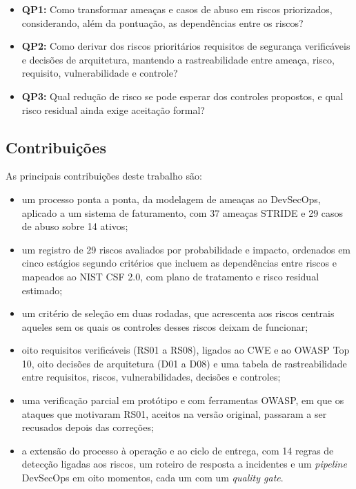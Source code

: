\documentclass[conference]{IEEEtran}
\begin{document}
\begin{itemize}
    \item \textbf{QP1:} Como transformar ameaças e casos de abuso em riscos priorizados, considerando, além da pontuação, as dependências entre os riscos?
    \item \textbf{QP2:} Como derivar dos riscos prioritários requisitos de segurança verificáveis e decisões de arquitetura, mantendo a rastreabilidade entre ameaça, risco, requisito, vulnerabilidade e controle?
    \item \textbf{QP3:} Qual redução de risco se pode esperar dos controles propostos, e qual risco residual ainda exige aceitação formal?
\end{itemize}

\subsection{Contribuições}

As principais contribuições deste trabalho são:

\begin{itemize}
    \item um processo ponta a ponta, da modelagem de ameaças ao DevSecOps, aplicado a um sistema de faturamento, com 37 ameaças STRIDE e 29 casos de abuso sobre 14 ativos;
    \item um registro de 29 riscos avaliados por probabilidade e impacto, ordenados em cinco estágios segundo critérios que incluem as dependências entre riscos e mapeados ao NIST CSF 2.0, com plano de tratamento e risco residual estimado;
    \item um critério de seleção em duas rodadas, que acrescenta aos riscos centrais aqueles sem os quais os controles desses riscos deixam de funcionar;
    \item oito requisitos verificáveis (RS01 a RS08), ligados ao CWE e ao OWASP Top 10, oito decisões de arquitetura (D01 a D08) e uma tabela de rastreabilidade entre requisitos, riscos, vulnerabilidades, decisões e controles;
    \item uma verificação parcial em protótipo e com ferramentas OWASP, em que os ataques que motivaram RS01, aceitos na versão original, passaram a ser recusados depois das correções;
    \item a extensão do processo à operação e ao ciclo de entrega, com 14 regras de detecção ligadas aos riscos, um roteiro de resposta a incidentes e um \textit{pipeline} DevSecOps em oito momentos, cada um com um \textit{quality gate}.
\end{itemize}
\end{document}
